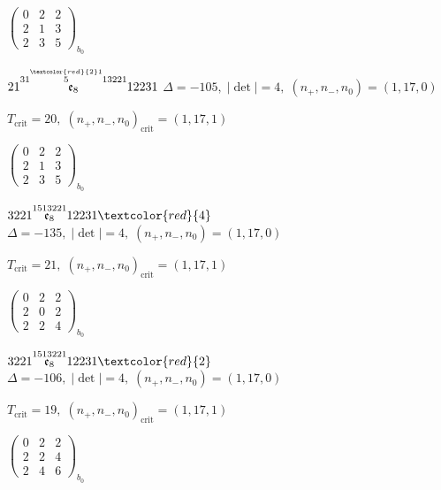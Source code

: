 \documentclass[10pt]{article}
\begin{document}
\hspace{2em}$\left(\begin{smallmatrix}0 & 2 & 2 \\ 2 & 1 & 3 \\ 2 & 3 & 5\end{smallmatrix}\right)_{\!b_0}$

\smallskip

$21\overset{31\overset{\textcolor{red}{2}1}{5}13221}{\mathfrak{e}_8}12231$ \quad $\Delta=-105,\; |\det|=4,\; (n_+,n_-,n_0)=(1,17,0)$

\hspace{1em}$T_{\text{crit}}=20,\; (n_+,n_-,n_0)_{\text{crit}}=(1,17,1)$

\hspace{2em}$\left(\begin{smallmatrix}0 & 2 & 2 \\ 2 & 1 & 3 \\ 2 & 3 & 5\end{smallmatrix}\right)_{\!b_0}$

\smallskip

$3221\overset{1513221}{\mathfrak{e}_8}12231\textcolor{red}{4}$ \quad $\Delta=-135,\; |\det|=4,\; (n_+,n_-,n_0)=(1,17,0)$

\hspace{1em}$T_{\text{crit}}=21,\; (n_+,n_-,n_0)_{\text{crit}}=(1,17,1)$

\hspace{2em}$\left(\begin{smallmatrix}0 & 2 & 2 \\ 2 & 0 & 2 \\ 2 & 2 & 4\end{smallmatrix}\right)_{\!b_0}$

$3221\overset{1513221}{\mathfrak{e}_8}12231\textcolor{red}{2}$ \quad $\Delta=-106,\; |\det|=4,\; (n_+,n_-,n_0)=(1,17,0)$

\hspace{1em}$T_{\text{crit}}=19,\; (n_+,n_-,n_0)_{\text{crit}}=(1,17,1)$

\hspace{2em}$\left(\begin{smallmatrix}0 & 2 & 2 \\ 2 & 2 & 4 \\ 2 & 4 & 6\end{smallmatrix}\right)_{\!b_0}$
\end{document}
